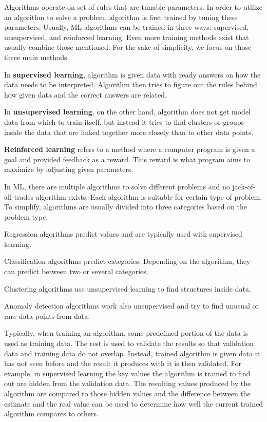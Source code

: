 Algorithms operate on set of rules
that are tunable parameters.
In order to utilize an algorithm to solve a problem,
algorithm is first trained by tuning these parameters.
Usually,
ML algorithms can be trained in three ways:
supervised, unsupervised, and reinforced learning.\cite{jordan2015machine}
Even more training methods exist
that usually combine those mentioned.\cite{ayodele2010types, mahesh2020machine}
For the sake of simplicity,
we focus on those three main methods.

In \textbf{supervised learning},
algorithm is given data with ready answers on
how the data needs to be interpreted.
Algorithm then tries to figure out the rules behind
how given data and the correct answers are related.\cite{ayodele2010types}


In \textbf{unsupervised learning},
on the other hand,
algorithm does not get model data from which to train itself,
but instead it tries to find clusters or groups inside the data
that are linked together more closely than to other data points.

\textbf{Reinforced learning} refers to a method
where a computer program is given a goal
and provided feedback as a reward.
This reward is what program aims to maximize
by adjusting given parameters. %

In ML,
there are multiple algorithms to solve different problems
and no jack-of-all-trades algorithm exists.
Each algorithm is suitable for certain type of problem.
To simplify,
algorithms are usually divided into three categories
based on the problem type.

Regression algorithms predict values
and are typically used with supervised learning.


Classification algorithms predict categories.
Depending on the algorithm,
they can predict between two or several categories.

Clustering algorithms use unsupervised learning
to find structures inside data.

Anomaly detection algorithms work also unsupervised
and try to find unusual or rare data points from data.



Typically,
when training an algorithm,
some predefined portion of the data
is used as training data.
The rest is used to validate the results
so that validation data and training data do not overlap.
Instead, trained algorithm is given data it has not seen before
and the result it produces with it is then validated.
For example,
in supervised learning
the key values the algorithm is trained to find out
are hidden from the validation data.
The resulting values produced by the algorithm
are compared to those hidden values
and the difference between the estimate and the real value
can be used to determine how well the current trained algorithm compares to others.


